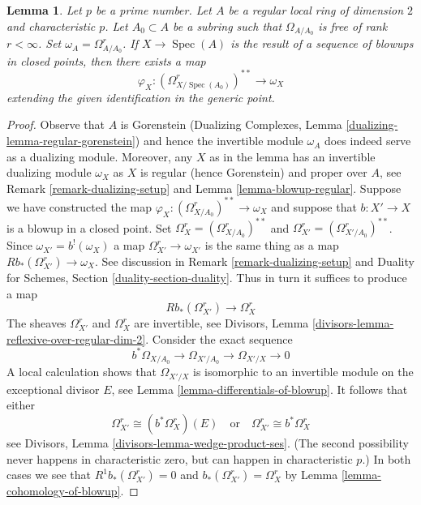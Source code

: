 \documentclass[10pt,a4paper]{amsart}
\theoremstyle{plain}
\newtheorem{lemma}[subsection]{Lemma}
\theoremstyle{definition}
\theoremstyle{remark}
\numberwithin{equation}{subsection}
\def\Spec{\mathop{\mathrm{Spec}}}
\begin{document}
\begin{lemma}
\label{lemma-compare-differentials-dualizing}
Let $p$ be a prime number.
Let $A$ be a regular local ring of dimension $2$ and characteristic $p$.
Let $A_0 \subset A$ be a subring such that $\Omega_{A/A_0}$ is free
of rank $r < \infty$. Set $\omega_A = \Omega^r_{A/A_0}$. If $X \to \Spec(A)$
is the result of a sequence of blowups in closed points, then
there exists a map
$$
\varphi_X : (\Omega^r_{X/\Spec(A_0)})^{**} \longrightarrow \omega_X
$$
extending the given identification in the generic point.
\end{lemma}

\begin{proof}
Observe that $A$ is Gorenstein (Dualizing Complexes,
Lemma \ref{dualizing-lemma-regular-gorenstein})
and hence the invertible module $\omega_A$ does indeed serve
as a dualizing module. Moreover, any $X$ as in the lemma
has an invertible dualizing module $\omega_X$ as $X$ is regular
(hence Gorenstein) and proper over $A$, see
Remark \ref{remark-dualizing-setup} and
Lemma \ref{lemma-blowup-regular}.
Suppose we have constructed the map
$\varphi_X : (\Omega^r_{X/A_0})^{**} \to \omega_X$
and suppose that $b : X' \to X$ is a blowup in a closed point.
Set $\Omega^r_X = (\Omega^r_{X/A_0})^{**}$ and
$\Omega^r_{X'} = (\Omega^r_{X'/A_0})^{**}$. Since $\omega_{X'} = b^!(\omega_X)$
a map $\Omega^r_{X'} \to \omega_{X'}$ is the same thing as a map
$Rb_*(\Omega^r_{X'}) \to \omega_X$. See discussion in
Remark \ref{remark-dualizing-setup} and
Duality for Schemes, Section \ref{duality-section-duality}.
Thus in turn it suffices to produce a map
$$
Rb_*(\Omega^r_{X'}) \longrightarrow \Omega^r_X
$$
The sheaves $\Omega^r_{X'}$ and $\Omega^r_X$ are invertible, see
Divisors, Lemma \ref{divisors-lemma-reflexive-over-regular-dim-2}.
Consider the exact sequence
$$
b^*\Omega_{X/A_0} \to \Omega_{X'/A_0} \to \Omega_{X'/X} \to 0
$$
A local calculation shows that $\Omega_{X'/X}$ is isomorphic
to an invertible module on the exceptional divisor $E$, see
Lemma \ref{lemma-differentials-of-blowup}. It follows that
either
$$
\Omega^r_{X'} \cong (b^*\Omega^r_X)(E)
\quad\text{or}\quad
\Omega^r_{X'} \cong b^*\Omega^r_X
$$
see Divisors, Lemma \ref{divisors-lemma-wedge-product-ses}.
(The second possibility never happens in characteristic zero, but
can happen in characteristic $p$.) In both cases we see that
$R^1b_*(\Omega^r_{X'}) = 0$ and $b_*(\Omega^r_{X'}) = \Omega^r_X$ by
Lemma \ref{lemma-cohomology-of-blowup}.
\end{proof}
\end{document}
